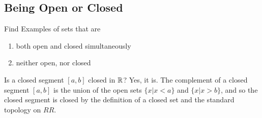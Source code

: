 \subsection{Being Open or Closed}
\begin{majorEx} %
  Find Examples of sets that are 
  \begin{enumerate}
  \item both open and closed simultaneously
  \item neither open, nor closed
  \end{enumerate}
\end{majorEx}

\begin{minorEx} %
\end{minorEx}

\begin{majorEx} %
Is a closed segment $[a, b]$ closed in $\mathbb{R}$?
Yes, it is. The complement of a closed segment $[a, b]$ is the union of the open sets $\{x | x < a\}$ and $\{x | x > b\}$, and so the closed segment is closed by the definition of a closed set and the standard topology on $RR$.
\end{majorEx}

